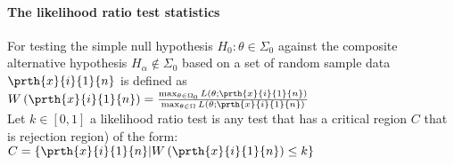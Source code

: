 \paragraph{The likelihood ratio test statistics}
For testing the simple null hypothesis $H_{0}:\theta\in\Sigma_{0}$ 
against the composite alternative hypothesis $H_{\alpha}\notin\Sigma_{0}$ based on a set of random sample data $\prth{x}{i}{1}{n}$ is defined
as $W\left(\prth{x}{i}{1}{n}\right) = \frac{\max_{{\theta\in\Omega_{0}}}L\left(\theta;\prth{x}{i}{1}{n}\right)}{\max_{\theta\in\Omega}L\left(\theta;\prth{x}{i}{1}{n}\right)}$ \\
Let $k\in[0,1]$ a likelihood ratio test is any test that has a critical
region $C$ that is rejection region) of the form:
$C=\left\{\prth{x}{i}{1}{n}|W\left(\prth{x}{i}{1}{n}\right)\leq k\right\}$
